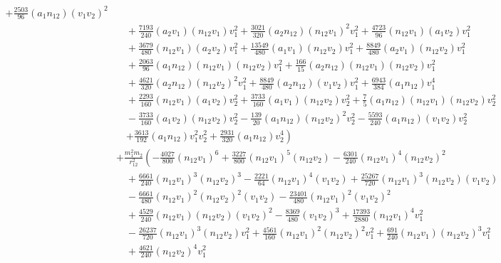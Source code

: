 \documentclass[prd,preprint,superscriptaddress,tightenlines,nofootinbib,
  eqsecnum,showpacs]{revtex4}
\begin{document}
{\begin{subequations}
\begin{align}
 + \frac{2503}{96} (a_1 n_{12}) (v_1 v_2)^2\nonumber\\
& \quad + \frac{7193}{240} (a_2 v_1) (n_{12} v_1) v_1^{2}
 + \frac{3021}{320} (a_2 n_{12}) (n_{12} v_1)^2 v_1^{2}
 + \frac{4723}{96} (n_{12} v_1) (a_1 v_2) v_1^{2}\nonumber\\
& \quad + \frac{3679}{480} (n_{12} v_1) (a_2 v_2) v_1^{2}
 + \frac{13549}{480} (a_1 v_1) (n_{12} v_2) v_1^{2}
 + \frac{8849}{480} (a_2 v_1) (n_{12} v_2) v_1^{2}\nonumber\\
& \quad + \frac{2063}{96} (a_1 n_{12}) (n_{12} v_1) (n_{12} v_2) v_1^{2}
 + \frac{166}{15} (a_2 n_{12}) (n_{12} v_1) (n_{12} v_2) v_1^{2}\nonumber\\
& \quad + \frac{4621}{320} (a_2 n_{12}) (n_{12} v_2)^2 v_1^{2}
 + \frac{8849}{480} (a_2 n_{12}) (v_1 v_2) v_1^{2}
 + \frac{6943}{384} (a_1 n_{12}) v_1^{4}\nonumber\\
& \quad + \frac{2293}{160} (n_{12} v_1) (a_1 v_2) v_2^{2}
 + \frac{3733}{160} (a_1 v_1) (n_{12} v_2) v_2^{2}
 + \frac{7}{5} (a_1 n_{12}) (n_{12} v_1) (n_{12} v_2) v_2^{2}\nonumber\\
& \quad -  \frac{3733}{160} (a_1 v_2) (n_{12} v_2) v_2^{2}
 -  \frac{139}{20} (a_1 n_{12}) (n_{12} v_2)^2 v_2^{2}
 -  \frac{5593}{240} (a_1 n_{12}) (v_1 v_2) v_2^{2}\nonumber\\
&\quad \left. + \frac{3613}{192} (a_1 n_{12}) v_1^{2} v_2^{2}
 + \frac{2931}{320} (a_1 n_{12}) v_2^{4}\right) \nonumber\\
& + \frac{m_{1}^2 m_{2}}{r_{12}^{2}} \left(- \frac{4027}{800} (n_{12} v_1)^6 
+ \frac{3227}{800} (n_{12} v_1)^5 (n_{12} v_2)
 -  \frac{6301}{240} (n_{12} v_1)^4 (n_{12} v_2)^2 \right.\nonumber\\
& \quad + \frac{6661}{240} (n_{12} v_1)^3 (n_{12} v_2)^3 
 -  \frac{2221}{64} (n_{12} v_1)^4 (v_1 v_2)
 + \frac{25267}{720} (n_{12} v_1)^3 (n_{12} v_2) (v_1 v_2)\nonumber\\
& \quad -  \frac{6661}{480} (n_{12} v_1)^2 (n_{12} v_2)^2 (v_1 v_2)
 -  \frac{23401}{480} (n_{12} v_1)^2 (v_1 v_2)^2\nonumber\\
& \quad + \frac{4529}{240} (n_{12} v_1) (n_{12} v_2) (v_1 v_2)^2
 -  \frac{8369}{480} (v_1 v_2)^3
 + \frac{17393}{2880} (n_{12} v_1)^4 v_1^{2}\nonumber\\
& \quad -  \frac{26237}{720} (n_{12} v_1)^3 (n_{12} v_2) v_1^{2}
 + \frac{4561}{160} (n_{12} v_1)^2 (n_{12} v_2)^2 v_1^{2}
 + \frac{691}{240} (n_{12} v_1) (n_{12} v_2)^3 v_1^{2}\nonumber\\
& \quad + \frac{4621}{240} (n_{12} v_2)^4 v_1^{2}

\end{align}
\end{subequations}}
\end{document}
